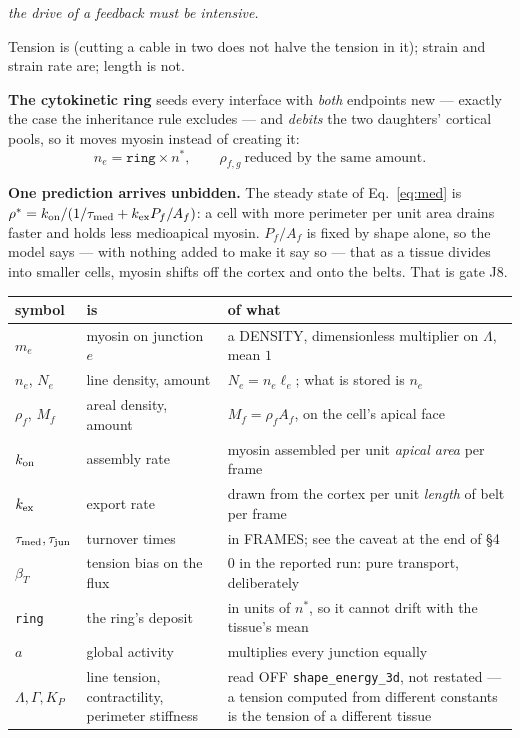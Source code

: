 \documentclass[10pt,a4paper]{article}
\newcommand{\op}[1]{\texttt{#1}}
\begin{document}
\begin{center}\itshape the drive of a feedback must be intensive.\end{center}

Tension is (cutting a cable in two does not halve the tension in it); strain and strain rate are;
length is not.

\textbf{The cytokinetic ring} seeds every interface with \emph{both} endpoints new --- exactly the case
the inheritance rule excludes --- and \emph{debits} the two daughters' cortical pools, so it moves
myosin instead of creating it:
%
\begin{equation}
n_e=\texttt{ring}\times n^\ast,\qquad
\rho_{f,g}\ \text{reduced by the same amount}.
\label{eq:ring}
\end{equation}

\textbf{One prediction arrives unbidden.} The steady state of Eq.~\eqref{eq:med} is
$\rho^\ast=k_{\rm on}/(1/\tau_{\rm med}+k_{\rm ex}P_f/A_f)$: a cell with more perimeter per unit area
drains faster and holds less medioapical myosin. $P_f/A_f$ is fixed by shape alone, so the model says
--- with nothing added to make it say so --- that as a tissue divides into smaller cells, myosin shifts
off the cortex and onto the belts. That is gate J8.

\smallskip
{\small\begin{tabular}{@{}llp{8.6cm}@{}}\toprule
symbol & is & of what\\\midrule
$m_e$ & myosin on junction $e$ & a DENSITY, dimensionless multiplier on $\Lambda$, mean $1$\\
$n_e$, $N_e$ & line density, amount & $N_e=n_e\ell_e$; what is stored is $n_e$\\
$\rho_f$, $M_f$ & areal density, amount & $M_f=\rho_fA_f$, on the cell's apical face\\
$k_{\rm on}$ & assembly rate & myosin assembled per unit \emph{apical area} per frame\\
$k_{\rm ex}$ & export rate & drawn from the cortex per unit \emph{length} of belt per frame\\
$\tau_{\rm med},\tau_{\rm jun}$ & turnover times & in FRAMES; see the caveat at the end of \S4\\
$\beta_T$ & tension bias on the flux & $0$ in the reported run: pure transport, deliberately\\
\texttt{ring} & the ring's deposit & in units of $n^\ast$, so it cannot drift with the tissue's mean\\
$a$ & global activity & multiplies every junction equally\\
$\Lambda,\Gamma,K_P$ & line tension, contractility, perimeter stiffness & read OFF
  \op{shape\_energy\_3d}, not restated --- a tension computed from different constants is the tension
  of a different tissue\\
\bottomrule\end{tabular}}
\end{document}
